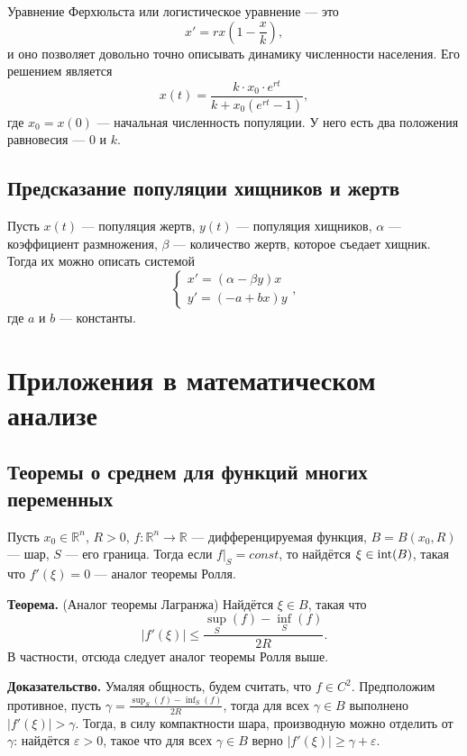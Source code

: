 Уравнение Ферхюльста или логистическое уравнение --- это
\[
    x' = rx \left(1 - \frac{x}{k} \right),
\]
и оно позволяет довольно точно описывать динамику численности населения.
Его решением является
\[
    x(t) = \frac{k \cdot x_0 \cdot e^{rt}}{k + x_0(e^{rt} - 1)},
\]
где $x_0 = x(0)$ --- начальная численность популяции.
У него есть два положения равновесия --- $0$ и $k$.

\subsection{Предсказание популяции хищников и жертв}
Пусть $x(t)$ --- популяция жертв, $y(t)$ --- популяция хищников, $\alpha$ --- коэффициент размножения, $\beta$ --- количество жертв, которое съедает хищник.
Тогда их можно описать системой
\[
    \begin{cases}
        x' = (\alpha - \beta y) x \\
        y' = (-a + bx) y
    \end{cases},
\]
где $a$ и $b$ --- константы.

\section{Приложения в математическом анализе}
\subsection{Теоремы о среднем для функций многих переменных}
Пусть $x_0 \in \mathbb R^n$, $R > 0$, $f: \mathbb R^n \to \mathbb R$ --- дифференцируемая функция, $B = B(x_0, R)$ --- шар, $S$ --- его граница.
Тогда если $f|_S = const$, то найдётся $\xi \in \operatorname{int}(B)$, такая что $f'(\xi) = 0$ --- аналог теоремы Ролля.

\textbf{Теорема.} (Аналог теоремы Лагранжа) Найдётся $\xi \in B$, такая что 
\[
    |f'(\xi)| \le \frac{\sup_S(f) - \inf_S(f)}{2R}.
\]
В частности, отсюда следует аналог теоремы Ролля выше.

\textbf{Доказательство.} Умаляя общность, будем считать, что $f \in C^2$.
Предположим противное, пусть $\gamma = \frac{\sup_S(f) - \inf_S(f)}{2R}$, тогда для всех $\gamma \in B$ выполнено $|f'(\xi)| > \gamma$.
Тогда, в силу компактности шара, производную можно отделить от $\gamma$: найдётся $\varepsilon > 0$, такое что для всех $\gamma \in B$ верно $|f'(\xi)| \ge \gamma + \varepsilon$.

